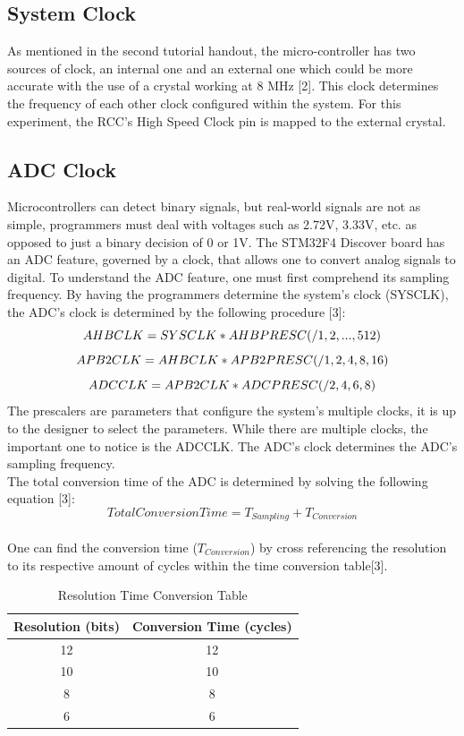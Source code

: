 \documentclass[12pt]{report}
\begin{document}
\subsection{System Clock}
As mentioned in the second tutorial handout, the micro-controller has two sources of clock, an internal one and an external one which could be more accurate with the use of a crystal working at 8 MHz [2]. This clock determines the frequency of each other clock configured within the system. For this experiment, the RCC's High Speed Clock pin is mapped to the external crystal.
\subsection{ADC Clock}
Microcontrollers can detect binary signals, but real-world signals are not as simple, programmers must deal with voltages such as 2.72V, 3.33V, etc. as opposed to just a binary decision of 0 or 1V. The STM32F4 Discover board has an ADC feature, governed by a clock, that allows one to convert analog signals to digital. To understand the ADC feature, one must first comprehend its sampling frequency.
By having the programmers determine the system's clock (SYSCLK), the ADC's clock is determined by the following procedure [3]:\\
\[ AHBCLK = SYSCLK * AHBPRESC (/1, 2, ..., 512)\\ \]
\[ APB2CLK = AHBCLK * APB2PRESC (/1, 2, 4, 8, 16)\\ \]
\[ ADCCLK = APB2CLK * ADCPRESC (/2, 4, 6, 8)\\ \]
The prescalers are parameters that configure the system's multiple clocks, it is up to the designer to select the parameters. While there are multiple clocks, the important one to notice is the ADCCLK. The ADC's clock determines the ADC's sampling frequency.\\
The total conversion time of the ADC is determined by solving the following equation [3]:\\
\[ Total Conversion Time = T_{Sampling} + T_{Conversion} \]\\
One can find the conversion time (\(T_{Conversion}\)) by cross referencing the resolution to its respective amount of cycles within the time conversion table[3].\\
\begin{table}[h]\label{adcres}
	\caption{Resolution Time Conversion Table}
	\begin{center}
		\begin{tabular}{|c|c|}
		\hline
		Resolution (bits) & Conversion Time (cycles)\\\hline
		12 & 12 \\\hline
		10  & 10 \\\hline
		8  & 8 \\\hline
		6  & 6 \\\hline
	\end{tabular}
	\end{center}
\end{table}
\end{document}
